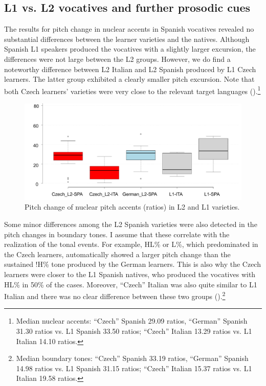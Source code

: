 \subsection{L1 vs. L2 vocatives and further prosodic cues}\label{sec:4.5.4}

The results for pitch change in nuclear accents in Spanish vocatives revealed no substantial differences between the learner varieties and the natives. Although Spanish L1 speakers produced the vocatives with a slightly larger excursion, the differences were not large between the L2 groups. However, we do find a noteworthy difference between L2 Italian and L2 Spanish produced by L1 Czech learners. The latter group exhibited a clearly smaller pitch excursion. Note that both Czech learners’ varieties were very close to the relevant target languages ().\footnote{Median nuclear accents: “Czech” Spanish 29.09 ratios, “German” Spanish 31.30 ratios vs. L1 Spanish 33.50 ratios; “Czech” Italian 13.29 ratios vs. L1 Italian 14.10 ratios.}

\begin{figure}


\includegraphics[width=\textwidth]{figures/Figure_145}



\caption{Pitch change of nuclear pitch accents (ratios) in L2 and L1 varieties.}
\label{fig:4.145}
\end{figure}

Some minor differences among the L2 Spanish varieties were also detected in the pitch changes in boundary tones. I assume that these correlate with the realization of the tonal events. For example, HL\% or L\%, which predominated in the Czech learners, automatically showed a larger pitch change than the sustained !H\% tone produced by the German learners. This is also why the Czech learners were closer to the L1 Spanish natives, who produced the vocatives with HL\% in 50\% of the cases. Moreover, “Czech” Italian was also quite similar to L1 Italian and there was no clear difference between these two groups ().\footnote{Median boundary tones: “Czech” Spanish 33.19 ratios, “German” Spanish 14.98 ratios vs. L1 Spanish 31.15 ratios; “Czech” Italian 15.37 ratios vs. L1 Italian 19.58 ratios.}


